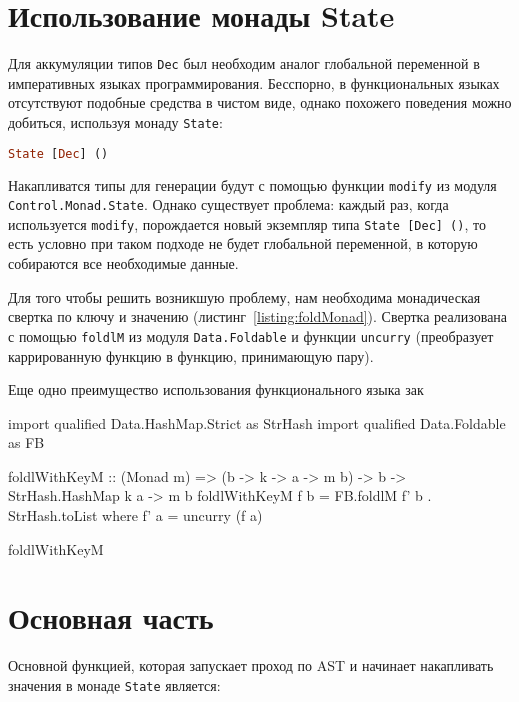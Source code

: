 \section{Использование монады State}

Для аккумуляции типов \lstinline{Dec} был необходим аналог глобальной переменной в императивных языках программирования. Бесспорно, в функциональных языках отсутствуют подобные средства в чистом виде, однако похожего поведения можно добиться, используя монаду \lstinline{State}:

\begin{lstlisting}[language=Haskell]
State [Dec] ()
\end{lstlisting}

Накапливатся типы для генерации будут с помощью функции \lstinline{modify} из модуля \lstinline{Control.Monad.State}. Однако существует проблема: каждый раз, когда используется \lstinline{modify}, порождается новый экземпляр типа \lstinline{State [Dec] ()}, то есть условно при таком подходе не будет глобальной переменной, в которую собираются все необходимые данные. 

Для того чтобы решить возникшую проблему, нам необходима монадическая свертка по ключу и значению (листинг~\ref{listing:foldMonad}). Свертка реализована с помощью \lstinline{foldlM} из модуля \lstinline{Data.Foldable} и функции \lstinline{uncurry} (преобразует каррированную функцию в функцию, принимающую пару).

Еще одно преимущество использования функционального языка зак

\begin{ListingEnv}[H]
\begin{Verb}
import qualified Data.HashMap.Strict as StrHash
import qualified Data.Foldable    as FB

foldlWithKeyM :: (Monad m) => (b -> k -> a -> m b) -> b ->
                                       StrHash.HashMap k a -> m b
foldlWithKeyM f b = FB.foldlM f' b . StrHash.toList
  where f' a = uncurry (f a)
\end{Verb}
\caption{foldlWithKeyM}
\label{listing:foldMonad}
\end{ListingEnv} 

\section{Основная часть}

Основной функцией, которая запускает проход по AST и начинает накапливать значения в монаде \lstinline{State} является: 

